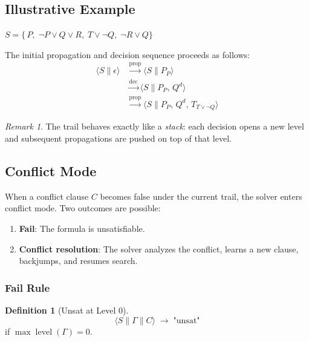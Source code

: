 \documentclass[11pt,a4paper]{article}
\theoremstyle{definition}
\newtheorem{definition}{Definition}[section]
\theoremstyle{plain}
\theoremstyle{remark}
\newtheorem*{remark}{Remark}
\begin{document}

\subsection{Illustrative Example}

\begin{tcolorbox}[colback=gray!5!white,colframe=gray!60!black,title=\textbf{Instance}]
$S = \{\, P,\; \neg P \lor Q \lor R,\; T \lor \neg Q,\; \neg R \lor Q \}$
\end{tcolorbox}

\noindent The initial propagation and decision sequence proceeds as follows:
\begin{align*}
\langle S \parallel \epsilon \rangle &\xrightarrow{\text{prop}} \langle S \parallel P_{P} \rangle\\[4pt]
&\xrightarrow{\text{dec}} \langle S \parallel P_{P},\, Q^{d} \rangle\\[4pt]
&\xrightarrow{\text{prop}} \langle S \parallel P_{P},\, Q^{d},\, T_{T \lor \neg Q} \rangle
\end{align*}

\begin{remark}
The trail behaves exactly like a \emph{stack}: each decision opens a new level and subsequent propagations are pushed on top of that level.
\end{remark}

\subsection{Conflict Mode}

When a conflict clause $C$ becomes false under the current trail, the solver enters conflict mode. Two outcomes are possible:
\begin{enumerate}
    \item \textbf{Fail}: The formula is unsatisfiable.
    \item \textbf{Conflict resolution}: The solver analyzes the conflict, learns a new clause, backjumps, and resumes search.
\end{enumerate}

\subsubsection{Fail Rule}

\begin{tcolorbox}[colback=red!5!white,colframe=red!75!black,title=\textbf{Fail Condition}]
\begin{definition}[Unsat at Level 0]
\[
\langle S \parallel \varGamma \parallel C \rangle \; \rightarrow \; \text{"unsat"}
\]
if $\max\operatorname{level}(\varGamma)=0$.
\end{definition}
\end{tcolorbox}
\end{document}

